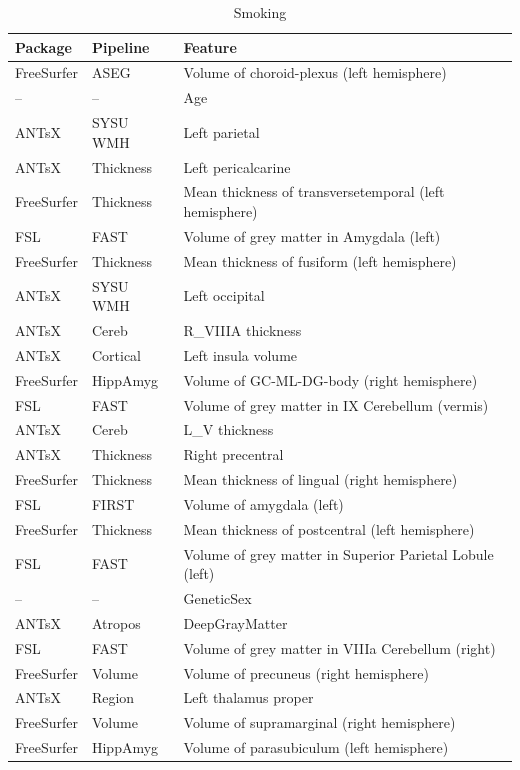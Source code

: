 \documentclass[
  10pt,
]{article}
\begin{document}
\begin{table}

\caption{\label{tab:compare-predictions}Smoking}
\centering
\begin{tabular}[t]{lll}
\toprule
Package & Pipeline & Feature\\
\midrule
FreeSurfer & ASEG & Volume of choroid-plexus (left hemisphere)\\
-- & -- & Age\\
ANTsX & SYSU WMH & Left parietal\\
ANTsX & Thickness & Left pericalcarine\\
FreeSurfer & Thickness & Mean thickness of transversetemporal (left hemisphere)\\
\addlinespace
FSL & FAST & Volume of grey matter in Amygdala (left)\\
FreeSurfer & Thickness & Mean thickness of fusiform (left hemisphere)\\
ANTsX & SYSU WMH & Left occipital\\
ANTsX & Cereb & R\_VIIIA thickness\\
ANTsX & Cortical & Left insula volume\\
\addlinespace
FreeSurfer & HippAmyg & Volume of GC-ML-DG-body (right hemisphere)\\
FSL & FAST & Volume of grey matter in IX Cerebellum (vermis)\\
ANTsX & Cereb & L\_V thickness\\
ANTsX & Thickness & Right precentral\\
FreeSurfer & Thickness & Mean thickness of lingual (right hemisphere)\\
\addlinespace
FSL & FIRST & Volume of amygdala (left)\\
FreeSurfer & Thickness & Mean thickness of postcentral (left hemisphere)\\
FSL & FAST & Volume of grey matter in Superior Parietal Lobule (left)\\
-- & -- & GeneticSex\\
ANTsX & Atropos & DeepGrayMatter\\
\addlinespace
FSL & FAST & Volume of grey matter in VIIIa Cerebellum (right)\\
FreeSurfer & Volume & Volume of precuneus (right hemisphere)\\
ANTsX & Region & Left thalamus proper\\
FreeSurfer & Volume & Volume of supramarginal (right hemisphere)\\
FreeSurfer & HippAmyg & Volume of parasubiculum (left hemisphere)\\
\bottomrule
\end{tabular}
\end{table}
\end{document}
